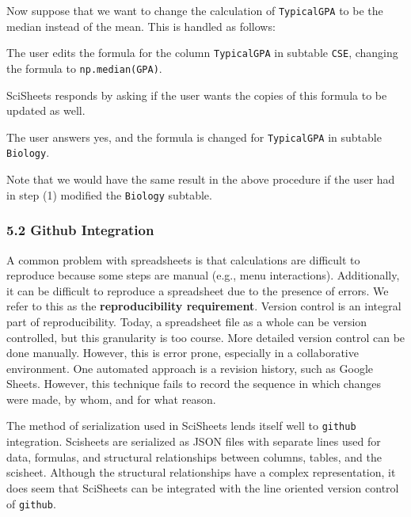 \documentclass[letterpaper,compsoc,twoside]{IEEEtran}
\begin{document}
Now suppose that we want to change the calculation of
\texttt{TypicalGPA} to be the median instead of the mean.
This is handled as follows:\setcounter{listcnt0}{0}
\begin{list}{.}
{
\setlength{\rightmargin}{\leftmargin}
}

\item 

The user edits the formula for the column \texttt{TypicalGPA} in
subtable \texttt{CSE},
changing the formula to
\texttt{np.median(GPA)}.
\item 

SciSheets responds by asking if the user wants the
copies of this formula
to be updated as well.
\item 

The user answers \textquotedbl{}yes\textquotedbl{}, and the formula is changed for
\texttt{TypicalGPA} in subtable \texttt{Biology}.\end{list}


Note that we would have the same result in the above procedure
if the user had in step (1) modified the \texttt{Biology} subtable.

\subsubsection{5.2 Github Integration%
  \label{github-integration}%
}


A common problem with spreadsheets is that calculations are difficult to reproduce
because some steps are manual (e.g., menu interactions). Additionally, it can be
difficult to reproduce a spreadsheet due to the presence of errors.
We refer to this as the \textbf{reproducibility requirement}.
Version control is an integral part of reproducibility.
Today, a spreadsheet file as a whole can be version controlled,
but this granularity is too course.
More detailed version control can be done manually.
However, this is error prone, especially
in a collaborative environment.
One automated approach is a revision history, such as
Google Sheets.
However, this technique fails to record the sequence in which changes were made, by whom,
and for what reason.

The method of serialization used in SciSheets lends itself well
to \texttt{github} integration.
Scisheets are serialized as JSON files with separate lines used for data, formulas,
and structural relationships between columns, tables, and the scisheet.
Although the structural relationships have a complex representation, it
does seem that SciSheets can be integrated with the line oriented version
control of \texttt{github}.
\end{document}
